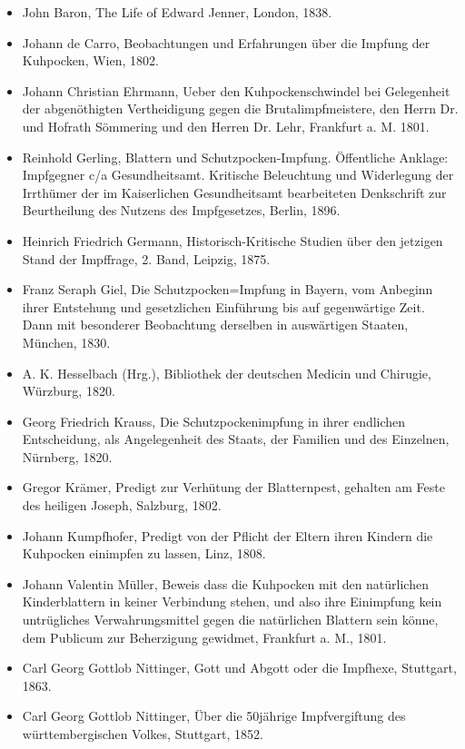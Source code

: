 \documentclass[
    a4paper,
    12pt,
    hyphens,
    chapterprefix=true,
    headheight=33pt,
    footheight=29pt,
    headings=optiontohead, %
]{scrartcl}
\begin{document}
{\begin{itemize}
\item{John Baron, The Life of Edward Jenner, London, 1838.}
\item{Johann de Carro, Beobachtungen und Erfahrungen über die Impfung der Kuhpocken, Wien, 1802.}
\item{Johann Christian Ehrmann, Ueber den Kuhpockenschwindel bei Gelegenheit der abgenöthigten Vertheidigung gegen die Brutalimpfmeistere, den Herrn Dr. und Hofrath Sömmering und den Herren Dr. Lehr, Frankfurt a. M. 1801.}
\item{Reinhold Gerling, Blattern und Schutzpocken-Impfung. Öffentliche Anklage: Impfgegner c/a Gesundheitsamt. Kritische  Beleuchtung  und  Widerlegung  der  Irrthümer der  im  Kaiserlichen  Gesundheitsamt  bearbeiteten  Denkschrift  zur Beurtheilung  des  Nutzens  des  Impfgesetzes, Berlin, 1896.}
\item{Heinrich Friedrich Germann, Historisch-Kritische Studien über den jetzigen Stand der Impffrage, 2. Band, Leipzig, 1875.}
\item{Franz Seraph Giel, Die Schutzpocken=Impfung in Bayern, vom Anbeginn ihrer Entstehung und gesetzlichen Einführung  bis auf gegenwärtige Zeit. Dann mit besonderer Beobachtung derselben in auswärtigen Staaten, München, 1830.}
\item{A. K. Hesselbach (Hrg.), Bibliothek der deutschen Medicin und Chirugie, Würzburg, 1820.}
\item{Georg Friedrich Krauss, Die Schutzpockenimpfung in ihrer endlichen Entscheidung, als Angelegenheit des Staats, der Familien und des Einzelnen, Nürnberg, 1820.}
\item{Gregor Krämer, Predigt zur Verhütung der Blatternpest, gehalten am Feste des heiligen Joseph, Salzburg, 1802.}
\item{Johann Kumpfhofer, Predigt von der Pflicht der Eltern ihren Kindern die Kuhpocken einimpfen zu lassen, Linz, 1808.}
\item{Johann Valentin Müller, Beweis dass die Kuhpocken mit den natürlichen Kinderblattern in keiner Verbindung stehen, und also ihre Einimpfung kein untrügliches Verwahrungsmittel gegen die natürlichen Blattern sein könne, dem Publicum zur Beherzigung gewidmet, Frankfurt a. M., 1801.}
\item{Carl Georg Gottlob Nittinger, Gott und Abgott oder die Impfhexe, Stuttgart, 1863.}
\item{Carl Georg Gottlob Nittinger, Über die 50jährige Impfvergiftung des württembergischen Volkes, Stuttgart, 1852.}

\end{itemize}}
\end{document}
